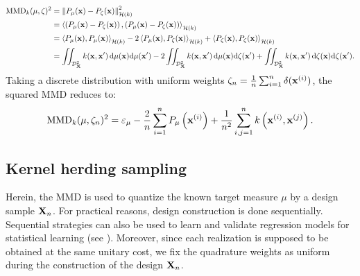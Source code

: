 \begin{subequations}
\begin{align}\label{eq:mmd2}
    \mathrm{MMD}_k(\mu, \zeta)^2 &= \left\lVert P_{\mu}({\bf x}) - P_{\zeta}({\bf x}) \right\lVert^2_{\mathcal{H}(k)}\\
        &= \left\langle \left(P_{\mu}({\bf x}) - P_{\zeta}({\bf x}) \right), \left(P_{\mu}({\bf x}) - P_{\zeta}({\bf x}) \right) \right\rangle_{\mathcal{H}(k)}\\
        &= \left\langle P_{\mu}({\bf x}), P_{\mu}({\bf x}) \right\rangle_{\mathcal{H}(k)} - 2 \left\langle P_{\mu}({\bf x}), P_{\zeta}({\bf x}) \right\rangle_{\mathcal{H}(k)} + \left\langle P_{\zeta}({\bf x}), P_{\zeta}({\bf x}) \right\rangle_{\mathcal{H}(k)}\\
        &= \iint_{\mathcal{D}_{{\bf X}}^2} k({\bf x}, {\bf x}')\, \mathrm{d}\mu({\bf x}) \mathrm{d}\mu({\bf x}') - 2 \iint_{\mathcal{D}_{{\bf X}}^2} k({\bf x}, {\bf x}')\, \mathrm{d}\mu({\bf x}) \mathrm{d}\zeta({\bf x}') + \iint_{\mathcal{D}_{{\bf X}}^2} k({\bf x}, {\bf x}')\, \mathrm{d}\zeta({\bf x}) \mathrm{d}\zeta({\bf x}').
\end{align}
\end{subequations}
Taking a discrete distribution with uniform weights $\zeta_n= \frac{1}{n} \sum_{i=1}^{n} \delta({\bf x}^{(i)})$, the squared MMD reduces to: 
\begin{equation}\label{eq:mmd_design}
    \mathrm{MMD}_k(\mu, \zeta_n)^2 = \varepsilon_\mu - \frac{2}{n} \sum_{i=1}^n P_{\mu}\left({\bf x}^{(i)}\right) + \frac{1}{n^2} \sum_{i, j=1}^n k\left({\bf x}^{(i)}, {\bf x}^{(j)}\right).
\end{equation}

\subsection{Kernel herding sampling}\label{sec:khsubsec}
Herein, the MMD is used to quantize the known target measure $\mu$ by a design sample ${\bf X}_n$. 
For practical reasons, design construction is done sequentially. 
Sequential strategies can also be used to learn and validate regression models for statistical learning (see \cite{fekhari_iooss_2023}). 
Moreover, since each realization is supposed to be obtained at the same unitary cost, we fix the quadrature weights as uniform during the construction of the design ${\bf X}_n$.

